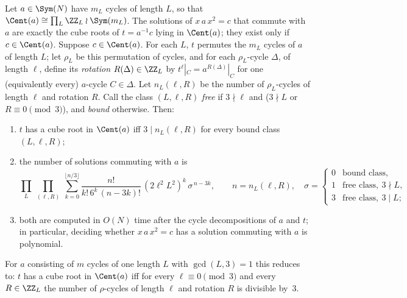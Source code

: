 \begin{lem}\label{lem:cent}
Let $a\in\Sym(N)$ have $m_L$ cycles of length $L$, so that $\Cent(a)\cong\prod_{L}\ZZ_L\wr\Sym(m_L)$. The solutions of $x\,a\,x^{2}=c$ that commute with $a$ are exactly the cube roots of $t=a^{-1}c$ lying in $\Cent(a)$; they exist only if $c\in\Cent(a)$. Suppose $c\in\Cent(a)$. For each $L$, $t$ permutes the $m_L$ cycles of $a$ of length $L$; let $\rho_L$ be this permutation of cycles, and for each $\rho_L$-cycle $\Delta$, of length $\ell$, define its \emph{rotation} $R(\Delta)\in\ZZ_L$ by $t^{\ell}|_{C}=a^{R(\Delta)}|_{C}$ for one (equivalently every) $a$-cycle $C\in\Delta$. Let $n_{L}(\ell,R)$ be the number of $\rho_L$-cycles of length $\ell$ and rotation $R$. Call the class $(L,\ell,R)$ \emph{free} if $3\nmid\ell$ and ($3\nmid L$ or $R\equiv0\pmod3$), and \emph{bound} otherwise. Then:
\begin{enumerate}
\item[(i)] $t$ has a cube root in $\Cent(a)$ iff $3\mid n_L(\ell,R)$ for every bound class $(L,\ell,R)$;
\item[(ii)] the number of solutions commuting with $a$ is
\begin{equation}\label{eq:centcount}
\prod_{L}\ \prod_{(\ell,R)}\ \sum_{k=0}^{\lfloor n/3\rfloor}\frac{n!}{k!\,6^{k}\,(n-3k)!}\,(2\ell^{2}L^{2})^{k}\,\sigma^{\,n-3k},
\qquad n=n_L(\ell,R),\quad
\sigma=\begin{cases}0&\text{bound class},\\ 1&\text{free class},\ 3\nmid L,\\ 3&\text{free class},\ 3\mid L;\end{cases}
\end{equation}
\item[(iii)] both are computed in $O(N)$ time after the cycle decompositions of $a$ and $t$; in particular, deciding whether $x\,a\,x^{2}=c$ has a solution commuting with $a$ is polynomial.
\end{enumerate}
For $a$ consisting of $m$ cycles of one length $L$ with $\gcd(L,3)=1$ this reduces to: $t$ has a cube root in $\Cent(a)$ iff for every $\ell\equiv0\pmod 3$ and every $R\in\ZZ_L$ the number of $\rho$-cycles of length $\ell$ and rotation $R$ is divisible by~$3$.
\end{lem}
